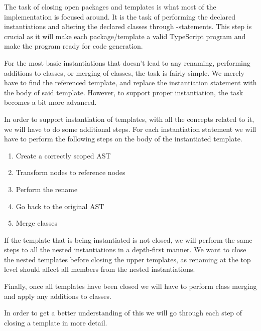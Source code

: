 The task of closing open packages and templates is what most of the implementation is focused around.
It is the task of performing the declared instantiations and altering the declared classes through -statements.
This step is crucial as it will make each package/template a valid TypeScript program and make the program ready for code generation.

For the most basic instantiations that doesn't lead to any renaming, performing additions to classes, or merging of classes, the task is fairly simple.
We merely have to find the referenced template, and replace the instantiation statement with the body of said template.
However, to support proper instantiation, the task becomes a bit more advanced.

In order to support instantiation of templates, with all the concepts related to it, we will have to do some additional steps.
For each instantiation statement we will have to perform the following steps on the body of the instantiated template.

\begin{enumerate}
    \item Create a correctly scoped AST
    \item Transform nodes to reference nodes{}
    \item Perform the rename
    \item Go back to the original AST
    \item Merge classes
\end{enumerate}

If the template that is being instantiated is not closed, we will perform the same steps to all the nested instantiations in a depth-first manner.
We want to close the nested templates before closing the upper templates, as renaming at the top level should affect all members from the nested instantiations.

Finally, once all templates have been closed we will have to perform class merging and apply any additions to classes.

In order to get a better understanding of this we will go through each step of closing a template in more detail.

%
%

